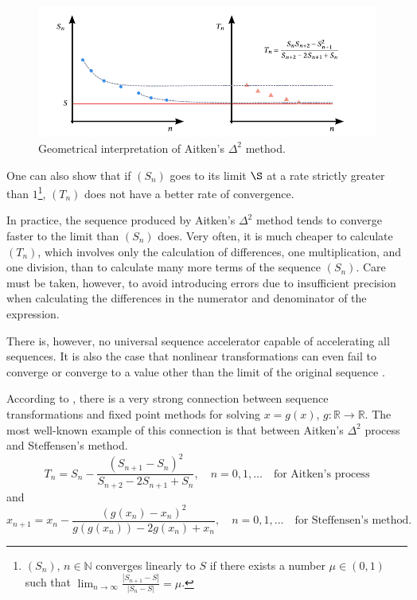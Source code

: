 \begin{figure}[htbp]
  \includegraphics{figures/aitken}
  \caption{Geometrical interpretation of Aitken's \(\Delta^2\) method.}
  \label{fig:aitken}
\end{figure}

One can also show that if \((S_n)\) goes to its limit \(\S\) at a rate strictly greater than \(1\)\footnote{$(S_{n})$, ${n \in \mathbb{N}}$ converges linearly to $S$ if there exists a number $\mu \in(0,1)$ such that \(\lim_{n \rightarrow \infty} \frac{\left|S_{n+1}-S\right|}{\left|S_{n}-S\right|}=\mu\).}, \((T_n)\) does not have a better rate of convergence.

In practice, the sequence produced by Aitken's \(\Delta^2\) method tends to converge faster to the limit than \((S_n)\) does.
Very often, it is much cheaper to calculate \((T_n)\), which involves only the calculation of differences, one multiplication, and one division, than to calculate many more terms of the sequence \((S_n)\).
Care must be taken, however, to avoid introducing errors due to insufficient precision when calculating the differences in the numerator and denominator of the expression.

There is, however, no universal sequence accelerator capable of accelerating all sequences.
It is also the case that nonlinear transformations can even fail to converge or converge to a value other than the limit of the original sequence \citep{brezinski_extrapolation_2013}.

According to \cite{brezinski_extrapolation_2013}, there is a very strong connection between sequence transformations and fixed point methods for solving \(x= g( x)\), \(g\colon \mathbb R\to \mathbb R\).
The most well-known example of this connection is that between Aitken's \(\Delta^{2}\) process and Steffensen's method.
\begin{equation}
T_{n}=S_{n}-\frac{\left(S_{n+1}-S_{n}\right)^{2}}{S_{n+2}-2 S_{n+1}+S_{n}}, \quad n=0,1, \ldots \quad\text{for Aitken's process}
\end{equation}
and
\begin{equation}
x_{n+1}=x_{n}-\frac{\left(g\left(x_{n}\right)-x_{n}\right)^{2}}{g\left(g\left(x_{n}\right)\right)-2 g\left(x_{n}\right)+x_{n}},\quad n=0,1, \ldots \quad\text{for Steffensen's method.}
\end{equation}

